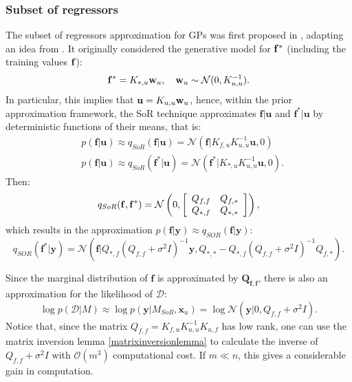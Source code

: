\subsubsection{Subset of regressors}
The subset of regressors approximation for GPs was first proposed in \cite{Smola_2001}, adapting an idea from \cite{Silverman_1985}. It originally considered the generative model for  ${\mathbf f}^*$ (including the training values ${\mathbf f}$):
\begin{equation}
{\mathbf f}^* = K_{*,u} \mathbf{w}_u, \quad \mathbf{w}_u \sim \mathcal{N}(0,K^{-1}_{u,u}).
\end{equation}
In particular, this implies that ${\mathbf u} = K_{u,u} \mathbf{w}_u$, hence, within the prior approximation framework, the SoR technique approximates $\mathbf{f}|\mathbf{u}$ and $\mathbf{f}^*|\mathbf{u}$ by deterministic functions of their means, that is:
\begin{equation}
\begin{split}
& p(\mathbf{f}|\mathbf{u}) \approx q_{SoR}(\mathbf{f}|\mathbf{u}) = \mathcal{N}(\mathbf{f}|K_{f,u} K_{u,u}^{-1} \mathbf{u},0) \\
& p(\mathbf{f}|\mathbf{u}) \approx q_{SoR}(\mathbf{f}^*|\mathbf{u}) = \mathcal{N}(\mathbf{f}^{*}|K_{*,u} K_{u,u}^{-1} \mathbf{u},0).
\end{split}
\end{equation}
Then:
\begin{equation}
q_{SoR}(\mathbf{f},\mathbf{f}^*) = \mathcal{N} 
\left( 0 , 
\left[ 
\begin{array}{c c} 
Q_{f,f}& Q_{f,*} \\
Q_{*,f} & Q_{*,*}
\end{array} \right]\right),
\end{equation}
which results in the approximation $p(\mathbf{f}|\mathbf{y}) \approx q_{SOR}(\mathbf{f}|\mathbf{y})$:
\begin{equation}
q_{SOR}(\mathbf{f}^*|\mathbf{y}) = \mathcal{N}(\mathbf{f}|Q_{*,f}(Q_{f,f} + \sigma^2 I)^{-1} \mathbf{y},Q_{*,*} - Q_{*,f}(Q_{f,f} + \sigma^2 I)^{-1} Q_{f,*}).
\end{equation}

Since the marginal distribution of $\mathbf{f}$ is approximated by $\mathbf{Q_{f,f}}$, there is also an approximation for the likelihood of $\mathcal{D}$:
\begin{equation}
\log p(\mathcal{D}|M) \approx \log p(\mathbf{y}|M_{SoR},\mathbf{x}_u) = \log \mathcal{N}(\mathbf{y}|0,Q_{f,f} + \sigma^2 I).
\end{equation}
Notice that, since the matrix $Q_{f,f} = K_{f,u} K_{u,u}^{-1} K_{u,f}$ has low rank, one can use the matrix inversion lemma \ref{matrixinversionlemma} to calculate the inverse of $Q_{f,f} + \sigma^2 I$ with $\mathcal{O}(m^3)$ computational cost. If $m \ll n$, this gives a considerable gain in computation.

